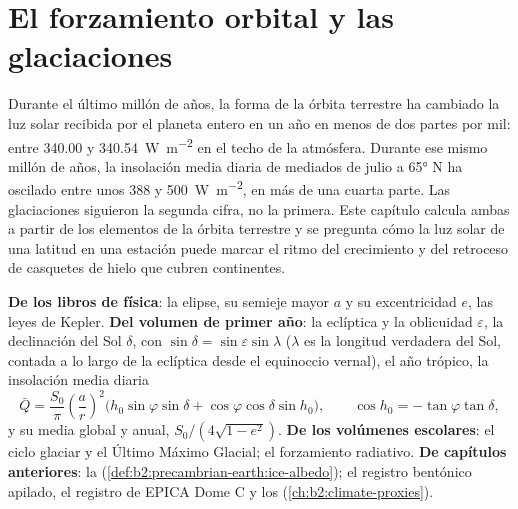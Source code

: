 \chapter{El forzamiento orbital y las glaciaciones}\label{ch:b2:orbital-forcing}

Durante el último millón de años, la forma de la órbita terrestre ha cambiado la luz solar recibida por
el planeta entero en un año en menos de dos partes por mil: entre \num{340.00} y
\qty{340.54}{W.m^{-2}} en el techo de la atmósfera. Durante ese mismo millón de años, la insolación media
diaria de mediados de julio a \ang{65} N ha oscilado entre unos 388 y \qty{500}{W.m^{-2}}, en más de
una cuarta parte. Las glaciaciones siguieron la segunda cifra, no la primera. Este capítulo calcula ambas
a partir de los elementos de la órbita terrestre y se pregunta cómo la luz solar de una latitud en una estación puede
marcar el ritmo del crecimiento y del retroceso de casquetes de hielo que cubren continentes.

\begin{recall}
\textbf{De los libros de física}: la elipse, su semieje mayor $a$ y su excentricidad $e$, las leyes de
Kepler. \textbf{Del volumen de primer año}: la eclíptica y la oblicuidad $\varepsilon$, la
declinación del Sol $\delta$, con $\sin\delta = \sin\varepsilon\sin\lambda$ ($\lambda$ es la longitud verdadera del Sol,
contada a lo largo de la eclíptica desde el equinoccio vernal), el año trópico, la insolación media
diaria
\[
  \bar Q = \frac{S_0}{\pi}\left(\frac{a}{r}\right)^{2}\bigl(h_0\sin\varphi\sin\delta +
  \cos\varphi\cos\delta\sin h_0\bigr),\qquad \cos h_0 = -\tan\varphi\tan\delta ,
\]
y su media global y anual, $S_0/(4\sqrt{1 - e^2})$. \textbf{De los volúmenes escolares}: el
ciclo glaciar y el Último Máximo Glacial; el forzamiento radiativo. \textbf{De capítulos anteriores}: la
 (\cref{def:b2:precambrian-earth:ice-albedo}); el registro bentónico apilado, el registro de EPICA
Dome C y los  (\cref{ch:b2:climate-proxies}).
\end{recall}

